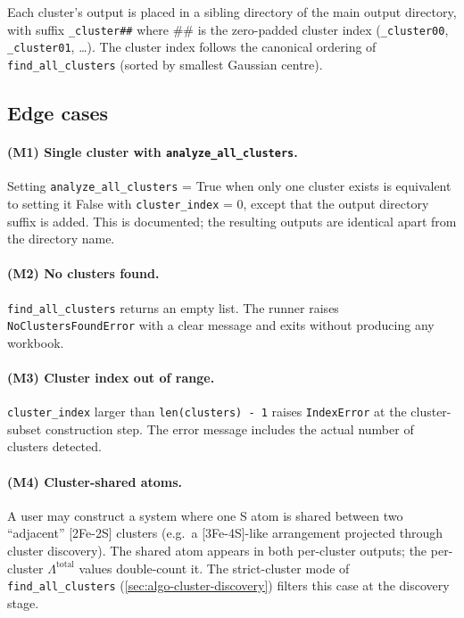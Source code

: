 \documentclass[10pt,a4paper,twoside]{article}
\newcommand{\fn}[1]{\texttt{#1}}
\newcommand{\cfgkey}[1]{\texttt{#1}}
\begin{document}
Each cluster's output is placed in a sibling directory of the
main output directory, with suffix \texttt{\_cluster\#\#} where \#\#
is the zero-padded cluster index (\texttt{\_cluster00},
\texttt{\_cluster01}, \dots). The cluster index follows the
canonical ordering of \fn{find\_all\_clusters} (sorted by smallest
Gaussian centre).

\subsection{Edge cases}

\paragraph{(M1) Single cluster with \cfgkey{analyze\_all\_clusters}.}
Setting \cfgkey{analyze\_all\_clusters} = True when only one
cluster exists is equivalent to setting it False with
\cfgkey{cluster\_index} = 0, except that the output directory
suffix is added. This is documented; the resulting outputs are
identical apart from the directory name.

\paragraph{(M2) No clusters found.}
\fn{find\_all\_clusters} returns an empty list. The runner raises
\texttt{NoClustersFoundError} with a clear message and exits
without producing any workbook.

\paragraph{(M3) Cluster index out of range.}
\cfgkey{cluster\_index} larger than \texttt{len(clusters) - 1}
raises \texttt{IndexError} at the cluster-subset construction
step. The error message includes the actual number of clusters
detected.

\paragraph{(M4) Cluster-shared atoms.}
A user may construct a system where one S atom is shared between
two ``adjacent'' [2Fe-2S] clusters (e.g.\ a [3Fe-4S]-like
arrangement projected through cluster discovery). The shared
atom appears in both per-cluster outputs; the per-cluster
$\Lambda^\text{total}$ values double-count it. The strict-cluster
mode of \fn{find\_all\_clusters} (\cref{sec:algo-cluster-discovery})
filters this case at the discovery stage.
\end{document}
